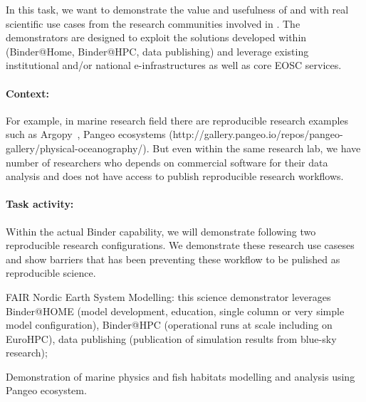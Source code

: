 \begin{task}[
  title=Science demonstrators,
  id=demos,
  lead=MP,
  PM=8,
  wphases={0-36},
  partners={IFR,UIO}
]

  In this task, we want to demonstrate the value and usefulness of  and
   with real scientific use cases from the research communities involved in \TheProject.
  The demonstrators are designed to exploit the solutions developed within \TheProject (Binder@Home, Binder@HPC, data publishing) 
  and leverage existing institutional and/or national e-infrastructures as well as core EOSC services.

\paragraph*{Context:}  For example, in marine research field there are reproducible research examples such as Argopy~\cite{maze2020},  Pangeo ecosystems (http://gallery.pangeo.io/repos/pangeo-gallery/physical-oceanography/). But even within the same research lab, we have number of researchers who depends on commercial software for their data analysis and does not have access to publish reproducible research workflows.   


\paragraph*{Task activity:}
 
Within the actual Binder capability, we will demonstrate following two reproducible research configurations.  We demonstrate these research use caseses and show barriers that has been preventing these workflow to be pulished as reproducible science.   



  \begin{compactitem}
  \item FAIR Nordic Earth System Modelling: this science demonstrator leverages Binder@HOME (model development, education, single column or very simple model configuration), Binder@HPC (operational runs at scale including on EuroHPC), data publishing (publication of simulation results from blue-sky research);
  \item Demonstration of marine physics and fish habitats modelling and analysis using Pangeo ecosystem.  
  

\end{compactitem}
\end{task}
